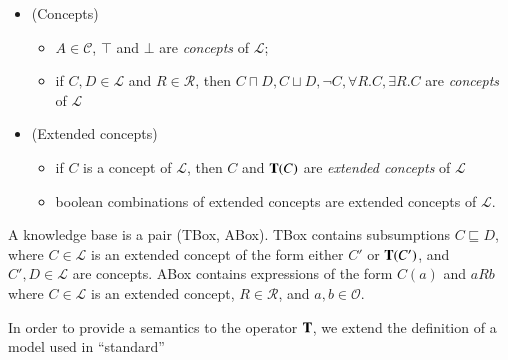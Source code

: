 \documentclass[a4paper, 11pt, oneside]{elsarticle}
\newcommand{\tip}{{\bf T}}
\newcommand{\alc}{\mathcal{ALC}}
\newcommand{\vero} {\top}
\newcommand{\elle} {\mathcal{L}}
\begin{document}
\begin{itemize}
\item (Concepts)
  \begin{itemize}
     \item $A \in \mathcal{C}$, $\vero$ and $\bot$ are \emph{concepts} of
$\elle$;
    \item if $C, D \in \elle$ and $R \in \mathcal{R}$, then $C
\sqcap D, C \sqcup D, \neg C, \forall R.C, \exists R.C$ are
\emph{concepts} of $\elle$
  \end{itemize}
\item (Extended concepts)
    \begin{itemize}
       \item if $C$ is a
concept of $\elle$, then $C$ and $\tip(C)$ are \emph{extended concepts} of $\elle$
     \item boolean combinations of extended concepts are extended
concepts of $\elle$.
    \end{itemize}
\end{itemize}

\noindent  A knowledge base is a pair (TBox, ABox). TBox
contains subsumptions $C \sqsubseteq D$, where $C \in \elle$ is
an extended concept of the form either $C'$ or $\tip(C')$, and $C', D \in
\elle$ are concepts. ABox contains expressions of the form $C(a)$
and $aRb$ where $C \in \elle$ is an extended concept, $R \in
\mathcal{R}$, and $a, b \in \mathcal{O}$.



In order to provide a semantics to the operator $\tip$, we extend the definition of a model used in ``standard''
\end{document}
